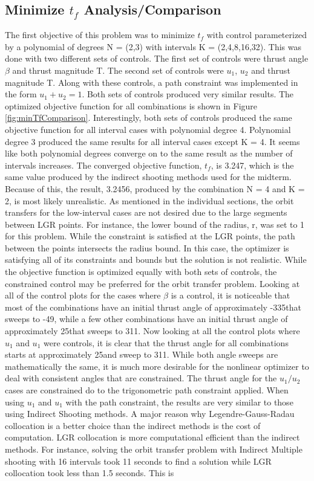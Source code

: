 \documentclass[]{article}
\begin{document}
	\subsection{Minimize \(t_f\) Analysis/Comparison}
	The first objective of this problem was to minimize \(t_f\) with control parameterized by a polynomial of degrees N = (2,3) with intervals K = (2,4,8,16,32). This was done with two different sets of controls. The first set of controls were thrust angle \(\beta\) and thrust magnitude T. The second set of controls were \(u_1\), \(u_2\) and thrust magnitude T. Along with these controls, a path constraint was implemented in the form \(u_1 + u_2 = 1\). Both sets of controls produced very similar results. The optimized objective function for all combinations is shown in Figure \ref{fig:minTfComparison}. Interestingly, both sets of controls produced the same objective function for all interval cases with polynomial degree 4. Polynomial degree 3 produced the same results for all interval cases except K = 4. It seems like both polynomial degrees converge on to the same result as the number of intervals increases. The converged objective function, \(t_f\), is 3.247, which is the same value produced by the indirect shooting methods used for the midterm. Because of this, the result, 3.2456, produced by the combination N = 4 and K = 2, is most likely unrealistic. As mentioned in the individual sections, the orbit transfers for the low-interval cases are not desired due to the large segments between LGR points. For instance, the lower bound of the radius, r, was set to 1 for this problem. While the constraint is satisfied at the LGR points, the path between the points intersects the radius bound. In this case, the optimizer is satisfying all of its constraints and bounds but the solution is not realistic. While the objective function is optimized equally with both sets of controls, the constrained control may be preferred for the orbit transfer problem. Looking at all of the control plots for the cases where \(\beta\) is a control, it is noticeable that most of the combinations have an initial thrust angle of approximately -335\degree that sweeps to -49\degree, while a few other combinations have an initial thrust angle of approximately 25\degree that sweeps to 311\degree. Now looking at all the control plots where \(u_1\) and \(u_1\) were controls, it is clear that the thrust angle for all combinations starts at approximately 25\degree and sweep to 311\degree. While both angle sweeps are mathematically the same, it is much more desirable for the nonlinear optimizer to deal with consistent angles that are constrained. The thrust angle for the \(u_1/u_2\) cases are constrained do to the trigonometric path constraint applied. When using \(u_1\) and \(u_1\) with the path constraint, the results are very similar to those using Indirect Shooting methods. A major reason why Legendre-Gauss-Radau collocation is a better choice than the indirect methods is the cost of computation. LGR collocation is more computational efficient than the indirect methods. For instance, solving the orbit transfer problem with Indirect Multiple shooting with 16 intervals took 11 seconds to find a solution while LGR collocation took less than 1.5 seconds. This is 
\end{document}
